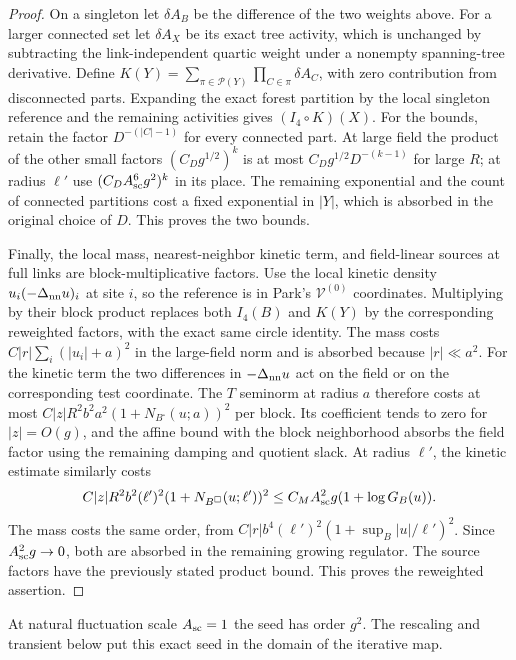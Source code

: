 \documentclass[11pt]{article}
\begin{document}
\begin{proof}
On a singleton let \(\delta A_B\) be the difference of the two
weights above. For a larger connected set let \(\delta A_X\) be
its exact tree activity, which is unchanged by subtracting the
link-independent quartic weight under a nonempty spanning-tree
derivative. Define \(K(Y)=\sum_{\pi\in\mathcal P(Y)}\prod_{C\in\pi}
\delta A_C\), with zero contribution from disconnected parts.
Expanding the exact forest partition by the local singleton
reference and the remaining activities gives \((I_4\circ K)(X)\).
For the bounds, retain the factor \(D^{-(|C|-1)}\) for every
connected part. At large field the product of the other small
factors \((C_Dg^{1/2})^k\) is at most
\(C_Dg^{1/2}D^{-(k-1)}\) for large \(R\); at radius \(\ell'\) use
\((C_DA_{\rm sc}^6g^2)^k\) in its place. The remaining exponential
and the count of connected partitions cost a fixed exponential
in \(|Y|\), which is absorbed in the original choice of \(D\).
This proves the two bounds.

Finally, the local mass, nearest-neighbor kinetic term, and
field-linear sources at full links are block-multiplicative
factors. Use the local kinetic density \(u_i(-\Delta_{\rm nn}u)_i\)
at site \(i\), so the reference is in Park's \(\mathcal V^{(0)}\)
coordinates. Multiplying by their block product replaces both
\(I_4(B)\) and \(K(Y)\) by the corresponding reweighted factors,
with the exact same circle identity. The mass costs
\(C|r|\sum_i(|u_i|+a)^2\) in the large-field norm and is
absorbed because \(|r|\ll a^2\). For the kinetic term the
two differences in \(-\Delta_{\rm nn}u\) act on the field or on
the corresponding test coordinate. The \(T\) seminorm at
radius \(a\) therefore costs at most
\(C|z|R^2 b^2a^2(1+N_{B^\square}(u;a))^2\) per block. Its
coefficient tends to zero for \(|z|=O(g)\), and the affine
bound with the block neighborhood absorbs the field factor
using the remaining damping and quotient slack. At radius
\(\ell'\), the kinetic estimate similarly costs
\[
 C|z|R^2 b^2(\ell')^2(1+N_{B^\square}(u;\ell'))^2
 \le C_M A_{\rm sc}^2g(1+\log G_B(u)).
\]
The mass costs the same order, from
\(C|r|b^4(\ell')^2(1+\sup_B|u|/\ell')^2\).
Since \(A_{\rm sc}^2g\to0\), both are absorbed in the remaining growing
regulator. The source factors have the previously stated
product bound. This proves the reweighted assertion.
\end{proof}

At natural fluctuation scale \(A_{\rm sc}=1\) the seed has order
\(g^2\). The rescaling and transient below put this exact seed in the
domain of the iterative map.
\end{document}
